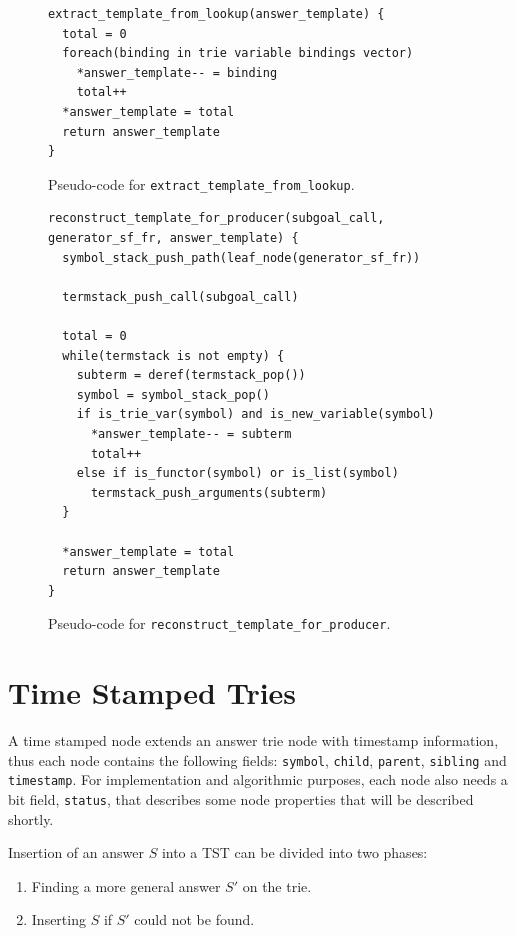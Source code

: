 \begin{figure}[ht]
\begin{Verbatim}
extract_template_from_lookup(answer_template) {
  total = 0
  foreach(binding in trie variable bindings vector)
    *answer_template-- = binding
    total++
  *answer_template = total
  return answer_template
}
\end{Verbatim}
\caption{Pseudo-code for \texttt{extract\_template\_from\_lookup}.}
\label{fig:extract_template_from_lookup}
\end{figure}

\begin{figure}[ht]
\begin{Verbatim}
reconstruct_template_for_producer(subgoal_call, generator_sf_fr, answer_template) {
  symbol_stack_push_path(leaf_node(generator_sf_fr))
  
  termstack_push_call(subgoal_call)
  
  total = 0
  while(termstack is not empty) {
    subterm = deref(termstack_pop())
    symbol = symbol_stack_pop()
    if is_trie_var(symbol) and is_new_variable(symbol)
      *answer_template-- = subterm
      total++
    else if is_functor(symbol) or is_list(symbol)
      termstack_push_arguments(subterm)
  }
  
  *answer_template = total
  return answer_template
}
\end{Verbatim}
\caption{Pseudo-code for \texttt{reconstruct\_template\_for\_producer}.}
\label{fig:reconstruct_template_for_producer}
\end{figure}

\section{Time Stamped Tries}

A time stamped node extends an answer trie node with timestamp information, thus
each node contains the following fields: \texttt{symbol}, \texttt{child}, \texttt{parent}, \texttt{sibling}
and \texttt{timestamp}. For implementation and algorithmic purposes, each node also needs a bit field,
\texttt{status}, that describes some node properties that will be described shortly.

Insertion of an answer $S$ into a TST can be divided into two phases:

\begin{enumerate}
  \item Finding a more general answer $S'$ on the trie.
  \item Inserting $S$ if $S'$ could not be found.
\end{enumerate}


